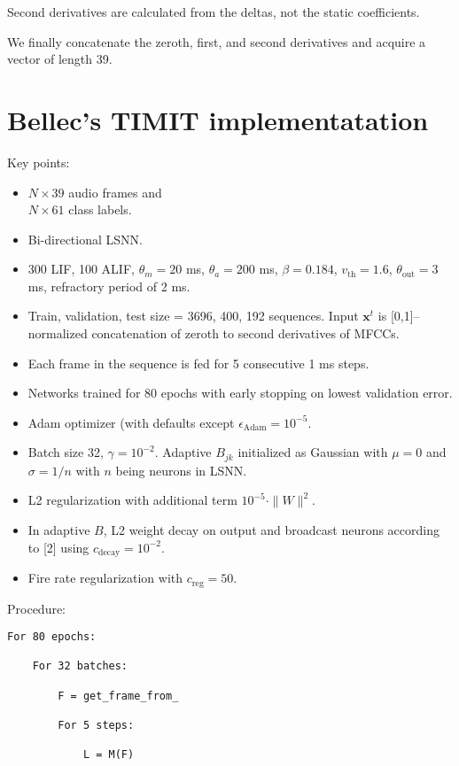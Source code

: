 \documentclass{article}
\begin{document}
Second derivatives are calculated from the deltas, not the static coefficients.

We finally concatenate the zeroth, first, and second derivatives and acquire a vector of length 39.

\section{Bellec's TIMIT implementatation}
Key points:
\begin{itemize}
\item $N\times39$ audio frames and \\
$N\times61$ class labels.
\item Bi-directional LSNN.
\item 300 LIF, 100 ALIF, $\theta_m = 20$ ms, $\theta_a = 200$ ms, $\beta = 0.184$, $v_\text{th} = 1.6$, $\theta_\text{out} = 3$ ms, refractory period of 2 ms.
\item Train, validation, test size = 3696, 400, 192 sequences. Input $\mathbf{x}^t$ is [0,1]--normalized concatenation of zeroth to second derivatives of MFCCs.
\item Each frame in the sequence is fed for 5 consecutive 1 ms steps.
\item Networks trained for 80 epochs with early stopping on lowest validation error.
\item Adam optimizer (with defaults except $\epsilon_\text{Adam} = 10^{-5}$.
\item Batch size 32, $\gamma = 10^{-2}$. Adaptive $B_{jk}$ initialized as Gaussian with $\mu = 0$ and $\sigma = 1/n$ with $n$ being neurons in LSNN.
\item L2 regularization with additional term $10^{-5} \cdot \|W\|^2$.
\item In adaptive $B$, L2 weight decay on output and broadcast neurons according to [2] using $c_\text{decay} = 10^{-2}$.
\item Fire rate regularization with $c_\text{reg} = 50$. 
\end{itemize}

Procedure:
\begin{verbatim}
For 80 epochs:
	
	For 32 batches:

		F = get_frame_from_		
		
		For 5 steps:
		
			L = M(F)
\end{verbatim}
\end{document}
